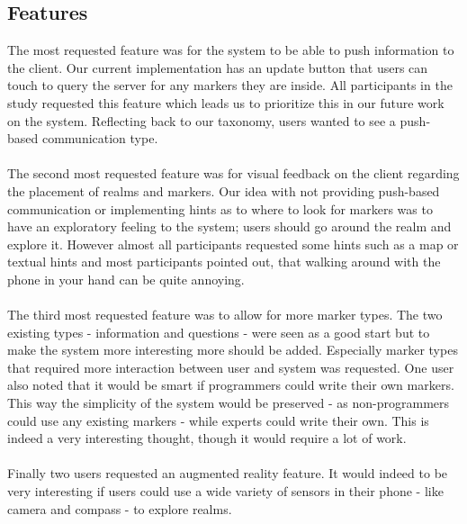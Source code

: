 \subsection{Features} %
\label{sub:features}
The most requested feature was for the system to be able to push information to the client. Our current implementation has an update button that users can touch to query the server for any markers they are inside. All participants in the study requested this feature which leads us to prioritize this in our future work on the system. Reflecting back to our taxonomy, users wanted to see a push-based communication type. 
\\\\
The second most requested feature was for visual feedback on the client regarding the placement of realms and markers. Our idea with not providing push-based communication or implementing hints as to where to look for markers was to have an exploratory feeling to the system; users should go around the realm and explore it. However almost all participants requested some hints such as a map or textual hints and most participants pointed out, that walking around with the phone in your hand can be quite annoying. 
\\\\
The third most requested feature was to allow for more marker types. The two existing types - information and questions - were seen as a good start but to make the system more interesting more should be added. Especially marker types that required more interaction between user and system was requested. One user also noted that it would be smart if programmers could write their own markers. This way the simplicity of the system would be preserved - as non-programmers could use any existing markers - while experts could write their own. This is indeed a very interesting thought, though it would require a lot of work.
\\\\
Finally two users requested an augmented reality feature. It would indeed to be very interesting if users could use a wide variety of sensors in their phone - like camera and compass - to explore realms.


